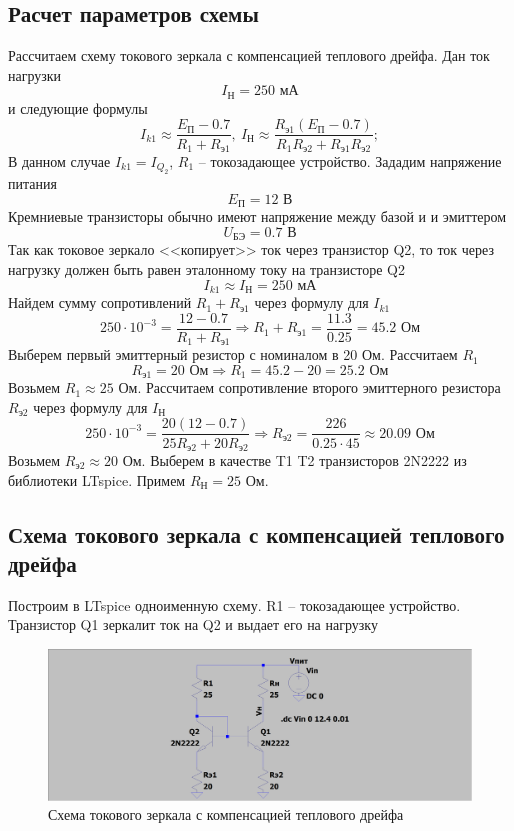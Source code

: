 \documentclass[a4paper, 12pt]{article}
\begin{document}
    \subsection{Расчет параметров схемы}
    Рассчитаем схему токового зеркала с компенсацией теплового дрейфа.
    Дан ток нагрузки $$I_\text{Н}=250\text{ мА}$$
    и следующие формулы
    $$
    I_{k1}\approx\dfrac{E_\text{П}-0.7}{R_1+R_\text{э1}},\ I_\text{Н}\approx\dfrac{R_\text{э1}\left( E_\text{П}-0.7 \right)}{R_1R_\text{э2}+R_\text{э1}R_\text{э2}};
    $$
    В данном случае $I_{k1}=I_{Q_2}$, $R_1$ -- токозадающее устройство. Зададим напряжение питания $$E_\text{П}=12\text{ В}$$
    Кремниевые транзисторы обычно имеют напряжение между базой и и эмиттером
    $$
    U_\text{БЭ}=0.7\text{ В}
    $$
    Так как токовое зеркало <<копирует>> ток через транзистор Q2, то ток через
    нагрузку должен быть равен эталонному току на транзисторе Q2
    $$
    I_{k1}\approx I_\text{Н}=250\text{ мА}
    $$
    Найдем сумму сопротивлений $R_1+R_\text{э1}$ через формулу для $I_{k1}$
    $$
    250\cdot10^{-3}=\dfrac{12-0.7}{R_1+R_\text{э1}}\Rightarrow R_1+R_\text{э1}=\dfrac{11.3}{0.25}=45.2\text{ Ом}
    $$
    Выберем первый эмиттерный резистор с номиналом в 20 Ом. Рассчитаем $R_1$
    $$
    R_\text{э1}=20\text{ Ом}\Rightarrow R_1=45.2-20=25.2\text{ Ом}
    $$
    Возьмем $R_1\approx25$ Ом. Рассчитаем сопротивление второго эмиттерного резистора $R_\text{э2}$ через формулу для $I_\text{Н}$
    $$
    250\cdot10^{-3}=\dfrac{20\left( 12-0.7 \right)}{25R_\text{э2}+20R_\text{э2}}\Rightarrow R_\text{э2}=\dfrac{226}{0.25\cdot45}\approx20.09\text{ Ом}
    $$
    Возьмем $R_\text{э2}\approx20$ Ом. Выберем в качестве T1 T2 транзисторов 2N2222 из библиотеки LTspice.
    Примем $R_\text{Н}=25$ Ом.


    \subsection{Схема токового зеркала с компенсацией теплового дрейфа}
    Построим в LTspice одноименную схему. R1 -- токозадающее устройство. Транзистор Q1 зеркалит ток на Q2
    и выдает его на нагрузку
    \begin{figure}[H]
        \centering
        \includegraphics[scale=0.22]{scheme1.png}
        \captionsetup{skip=0pt}
        \caption{Схема токового зеркала с компенсацией теплового дрейфа}
        \label{fig:scheme1}
    \end{figure}
\end{document}
